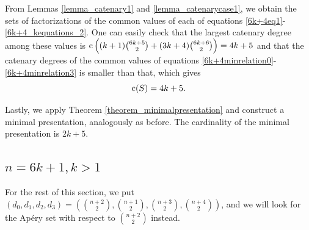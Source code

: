 \documentclass[12pt]{article}
\theoremstyle{remark}
\begin{document}
From Lemmas \ref{lemma_catenary1} and \ref{lemma_catenarycase1}, we obtain the sets of factorizations of the common values of each of equations \eqref{6k+4eq1}-\eqref{6k+4_kequations_2}.
One can easily check that the largest catenary degree among these values is $\textup{c} \left((k+1) \binom{6k+5}{2} + (3k+4) \binom{6k+6}{2} \right) = 4k+5$ and that the catenary degrees of the common values of equations \eqref{6k+4minrelation0}-\eqref{6k+4minrelation3} is smaller than that, which gives
$$ \textup{c}(S) = 4k+5.$$

Lastly, we apply Theorem \ref{theorem_minimalpresentation} and construct a minimal presentation, analogously as before. The cardinality of the minimal presentation is $2k+5$.



\subsection{$n = 6k+1, k>1$}
For the rest of this section, we put $(d_0,d_1,d_2,d_3) = \left(\binom{n+2}{2},\binom{n+1}{2},\binom{n+3}{2},\binom{n+4}{2} \right)$, and we will look for the Ap{\'e}ry set with respect to $\binom{n+2}{2}$ instead.
\end{document}
